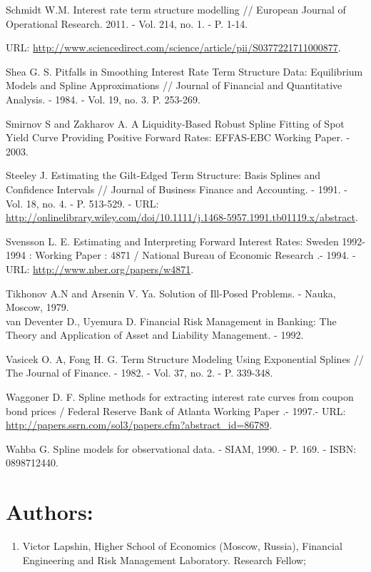 \documentclass[10pt]{article}
\begin{document}
Schmidt W.M. Interest rate term structure modelling // European Journal of Operational Research. 2011. - Vol. 214, no. 1. - P. 1-14.

URL: \href{http://www.sciencedirect.com/science/article/pii/S0377221711000877}{http://www.sciencedirect.com/science/article/pii/S0377221711000877}.

Shea G. S. Pitfalls in Smoothing Interest Rate Term Structure Data: Equilibrium Models and Spline Approximations // Journal of Financial and Quantitative Analysis. - 1984. - Vol. 19, no. 3. P. 253-269.

Smirnov S and Zakharov A. A Liquidity-Based Robust Spline Fitting of Spot Yield Curve Providing Positive Forward Rates: EFFAS-EBC Working Paper. - 2003.

Steeley J. Estimating the Gilt-Edged Term Structure: Basis Splines and Confidence Intervals // Journal of Business Finance and Accounting. - 1991. - Vol. 18, no. 4. - P. 513-529. - URL: \href{http://onlinelibrary.wiley.com/doi/10.1111/j.1468-5957.1991.tb01119.x/abstract}{http://onlinelibrary.wiley.com/doi/10.1111/j.1468-5957.1991.tb01119.x/abstract}.

Svensson L. E. Estimating and Interpreting Forward Interest Rates: Sweden 1992-1994 : Working Paper : 4871 / National Bureau of Economic Research .- 1994. - URL: \href{http://www.nber.org/papers/w4871}{http://www.nber.org/papers/w4871}.

Tikhonov A.N and Arsenin V. Ya. Solution of Ill-Posed Problems. - Nauka, Moscow, 1979.\\
van Deventer D., Uyemura D. Financial Risk Management in Banking: The Theory and Application of Asset and Liability Management. - 1992.

Vasicek O. A, Fong H. G. Term Structure Modeling Using Exponential Splines // The Journal of Finance. - 1982. - Vol. 37, no. 2. - P. 339-348.

Waggoner D. F. Spline methods for extracting interest rate curves from coupon bond prices / Federal Reserve Bank of Atlanta Working Paper .- 1997.- URL: \href{http://papers.ssrn.com/sol3/papers.cfm?abstract_id=86789}{http://papers.ssrn.com/sol3/papers.cfm?abstract\_id=86789}.

Wahba G. Spline models for observational data. - SIAM, 1990. - P. 169. - ISBN: 0898712440.

\section*{Authors:}
\begin{enumerate}
  \item Victor Lapshin, Higher School of Economics (Moscow, Russia), Financial Engineering and Risk Management Laboratory. Research Fellow;
\end{enumerate}
\end{document}
